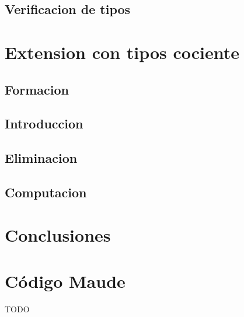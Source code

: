 \documentclass[a4paper,12pt]{report}
\theoremstyle{definition}
\theoremstyle{plain}
\theoremstyle{remark}
\begin{document}
    \section{Verificacion de tipos}

\chapter{Extension con tipos cociente}
    \section{Formacion}
    \section{Introduccion}
    \section{Eliminacion}
    \section{Computacion}
    
\chapter{Conclusiones}

\appendix

\chapter{C\'odigo Maude}

TODO
\nocite{*}

\end{document}
